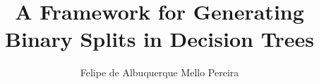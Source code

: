 \documentclass[msc,british,bibkey]{ThesisPUC_uk}
\author{\mbox{Felipe} \mbox{de} \mbox{Albuquerque} \mbox{Mello} \mbox{Pereira}}
\title{A Framework for Generating Binary Splits in Decision Trees}
\begin{document}
\newcommand{\remove}[1]{}
\newcommand{\dist}[3]{d(#1, #2)}
\newcommand{\distC}[2]{d(#1, #2)}
\newcommand{\OPT}[1]{\textrm{OPT}(#1)}
\newcommand{\OPTf}[2]{\textrm{OPT}(#1, #2)}
\newcommand{\Cf}[2]{\textrm{cost}(#1, #2)}
\newcommand{\C}[1]{\textrm{cost}(#1)}
\newcommand{\ans}[1]{\textbf{#1}}
\newcommand{\bl}{\textrm{blocked}}
\newcommand{\un}{\textrm{unassigned}}
\newcommand{\comments}[1]{}
\newcommand{\commento}[1]{\marginpar{\tiny \flushleft{#1}}}
\newtheorem{lemma}{Lemma}
\newtheorem{definition}{Definition}[section]








\begin{raggedright}
	
\end{raggedright}
\end{document}
